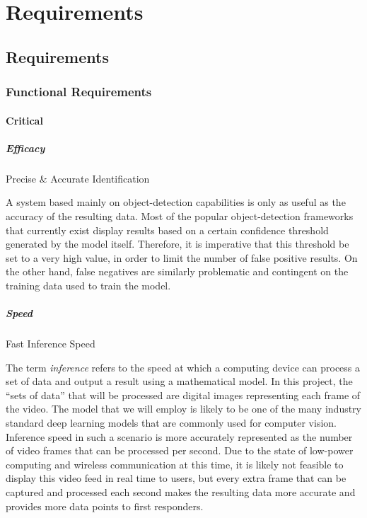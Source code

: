 \chapter{Requirements}
\section{Requirements}
\label{requirements}
\subsection{Functional Requirements}
\subsubsection{Critical}
  \paragraph{Efficacy} Precise \& Accurate Identification

  A system based mainly on object-detection capabilities is only as useful as the accuracy of the resulting data. Most of the popular object-detection frameworks that currently exist display results based on a certain confidence threshold generated by the model itself. Therefore, it is imperative that this threshold be set to a very high value, in order to limit the number of false positive results. On the other hand, false negatives are similarly problematic and contingent on the training data used to train the model.

  \paragraph{Speed} Fast Inference Speed

The term \emph{inference} refers to the speed at which a computing device can process a set of data and output a result using a mathematical model. In this project, the ``sets of data'' that will be processed are digital images representing each frame of the video. The model that we will employ is likely to be one of the many industry standard deep learning models that are commonly used for computer vision. Inference speed in such a scenario is more accurately represented as the number of video frames that can be processed per second. Due to the state of low-power computing and wireless communication at this time, it is likely not feasible to display this video feed in real time to users, but every extra frame that can be captured and processed each second makes the resulting data more accurate and provides more data points to first responders.
